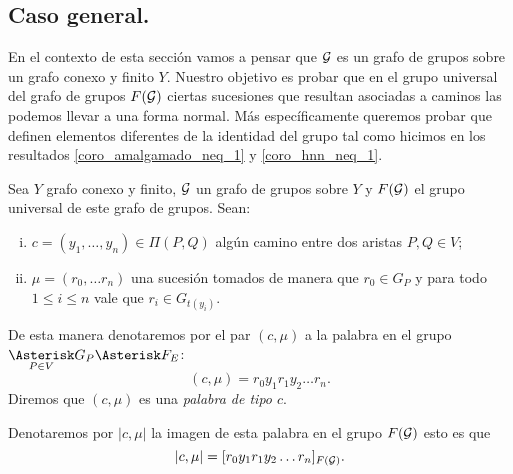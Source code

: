 \documentclass[tesis.tex]{subfiles}
\begin{document}
%


\subsection{ Caso general.}

En el contexto de esta sección vamos a pensar que ${\cal G}$ es un grafo de grupos sobre un grafo conexo y finito $Y$.
Nuestro objetivo es probar que en el grupo universal del grafo de grupos $F({\cal G})$ ciertas sucesiones que resultan asociadas a caminos las podemos llevar a una forma normal.
Más específicamente queremos probar que definen elementos diferentes de la identidad del grupo tal como hicimos en los resultados \ref{coro_amalgamado_neq_1} y \ref{coro_hnn_neq_1}.



\begin{deff}
	Sea $Y$ grafo conexo y finito, ${\cal G}$ un grafo de grupos sobre $Y$ y $F({\cal G})$ el grupo universal de este grafo de grupos.
	Sean:
	\begin{enumerate}[i)]
		\item $c=(y_1, \dots, y_n) \in \Pi(P,Q)$ algún camino entre dos aristas $P,Q \in V$;
		\item $\mu = (r_0, \dots r_n)$ una sucesión tomados de manera que $r_0 \in G_P$ y para todo $ 1 \le i \le n $ vale que $r_i \in G_{t(y_i)}$.
	\end{enumerate}
	De esta manera denotaremos por el par $(c, \mu)$ a la palabra en el grupo $\underset{P \in V}{\Asterisk} G_P \Asterisk F_E$:
	\[
	(c,\mu) = r_0 y_1 r_1 y_2 \dots r_n.
	\]
	Diremos que $(c, \mu)$ es una \emph{palabra de tipo $c$}.
\end{deff}
 
Denotaremos por $|c,\mu|$ la imagen de esta palabra en el grupo $F({\cal G})$ esto es que
\[
|c,\mu| = [r_0 y_1 r_1 y_2 \dots r_n]_{F({\cal G})}.
\]
\end{document}
